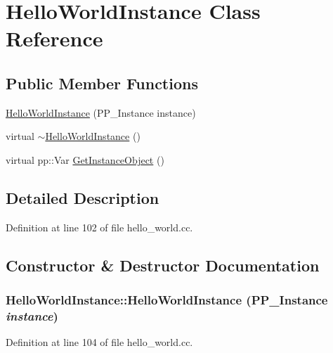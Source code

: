 \hypertarget{class_hello_world_instance}{
\section{HelloWorldInstance Class Reference}
\label{class_hello_world_instance}
}
\subsection*{Public Member Functions}
\begin{DoxyCompactItemize}
\item 
\hyperlink{class_hello_world_instance_add03eac81a09900135582a464bfcd8f8}{HelloWorldInstance} (PP\_\-Instance instance)
\item 
virtual \hyperlink{class_hello_world_instance_ab82a0f1aa35b3f8fbc2e107af026bfc5}{$\sim$HelloWorldInstance} ()
\item 
virtual pp::Var \hyperlink{class_hello_world_instance_ac489a6775aead72dc1b17d22d1eb6688}{GetInstanceObject} ()
\end{DoxyCompactItemize}


\subsection{Detailed Description}


Definition at line 102 of file hello\_\-world.cc.



\subsection{Constructor \& Destructor Documentation}
\hypertarget{class_hello_world_instance_add03eac81a09900135582a464bfcd8f8}{
\subsubsection[{HelloWorldInstance}]{\setlength{\rightskip}{0pt plus 5cm}HelloWorldInstance::HelloWorldInstance (PP\_\-Instance {\em instance})}}
\label{class_hello_world_instance_add03eac81a09900135582a464bfcd8f8}


Definition at line 104 of file hello\_\-world.cc.

